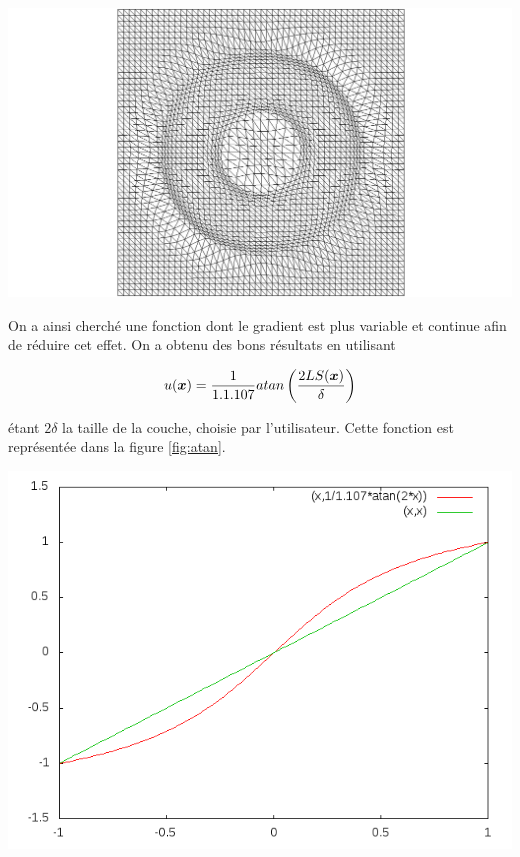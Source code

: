 \begingroup
  \centering
  \includegraphics[clip=true, trim = 10cm 0 10cm 0, scale=.25]{Bordeaux/figures/LSlin.png}
\endgroup

\indent On a ainsi cherché une fonction dont le gradient est plus variable et continue afin de réduire cet effet. On a obtenu des bons résultats en utilisant

\begin{equation}
	\label{eq:atan}
	u(\boldsymbol{x}) = \frac{1}{1.1.107} atan \left(\frac{2LS(\boldsymbol{x})}{\delta} \right)
\end{equation}

\noindent étant \(2\delta\) la taille de la couche, choisie par l'utilisateur. Cette fonction est représentée dans la figure \ref{fig:atan}.

\begingroup
  \centering
  \includegraphics[scale=.4]{Bordeaux/figures/atan.png}
\endgroup

